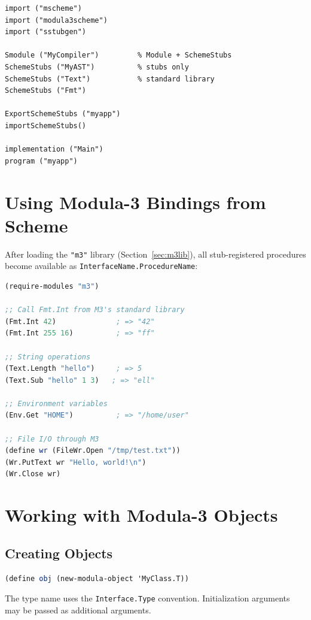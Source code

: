 \documentclass[12pt]{report}
\begin{document}
\begin{lstlisting}[language={}]
import ("mscheme")
import ("modula3scheme")
import ("sstubgen")

Smodule ("MyCompiler")         % Module + SchemeStubs
SchemeStubs ("MyAST")          % stubs only
SchemeStubs ("Text")           % standard library
SchemeStubs ("Fmt")

ExportSchemeStubs ("myapp")
importSchemeStubs()

implementation ("Main")
program ("myapp")
\end{lstlisting}

\section{Using Modula-3 Bindings from Scheme}\label{sec:usingm3}

After loading the {\tt "m3"} library
(Section~\ref{sec:m3lib}), all stub-registered procedures become
available as {\tt InterfaceName.ProcedureName}:

\begin{lstlisting}[language=Scheme]
(require-modules "m3")

;; Call Fmt.Int from M3's standard library
(Fmt.Int 42)              ; => "42"
(Fmt.Int 255 16)          ; => "ff"

;; String operations
(Text.Length "hello")     ; => 5
(Text.Sub "hello" 1 3)   ; => "ell"

;; Environment variables
(Env.Get "HOME")          ; => "/home/user"

;; File I/O through M3
(define wr (FileWr.Open "/tmp/test.txt"))
(Wr.PutText wr "Hello, world!\n")
(Wr.Close wr)
\end{lstlisting}

\section{Working with Modula-3 Objects}

\subsection{Creating Objects}

\begin{lstlisting}[language=Scheme]
(define obj (new-modula-object 'MyClass.T))
\end{lstlisting}

The type name uses the {\tt Interface.Type} convention.
Initialization arguments may be passed as additional arguments.
\end{document}

